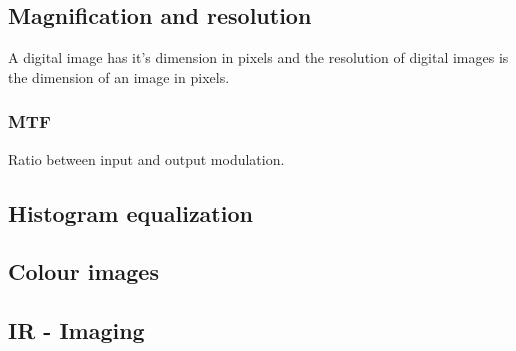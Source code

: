 \subsection{Magnification and resolution}
A digital image has it's dimension in pixels and the resolution of digital images is the dimension of an image in pixels.

\subsubsection{MTF}
Ratio between input and output modulation. 

\subsection{Histogram equalization}

\subsection{Colour images}

\subsection{IR - Imaging}